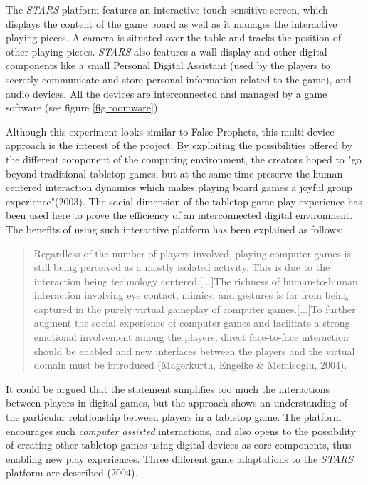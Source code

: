 The \textit{STARS} platform features an interactive touch-sensitive screen, which displays the content of the game board as well as it manages the interactive playing pieces. A camera is situated over the table and tracks the position of other playing pieces. \textit{STARS} also features a wall display and other digital components like a small Personal Digital Assistant (used by the players to secretly communicate and store personal information related to the game), and audio devices. All the devices are interconnected and managed by a game software (see figure \ref{fig:roomware}). 

Although this experiment looks similar to False Prophets, this multi-device approach is the interest of the project. By exploiting the possibilities offered by the different component of the computing environment, the creators hoped to "go beyond traditional tabletop games, but at the same time preserve the human centered interaction dynamics which makes playing board games a joyful group experience"(2003)\cite{art:stars}. The social dimension of the tabletop game play experience has been used here to prove the efficiency of an interconnected digital environment. The benefits of using such interactive platform has been explained as follows:
\begin{quotation}
Regardless of the number of players involved, playing computer games is still being perceived as a mostly isolated activity. This is due to the interaction being technology centered.[...]The richness of human-to-human interaction
involving eye contact, mimics, and gestures is far from being captured in the purely virtual gameplay of computer games.[...]To further augment the social experience of computer games and facilitate a strong emotional involvement among the players, direct face-to-face interaction should be enabled and new interfaces between the players and the virtual domain must be introduced (Magerkurth, Engelke \& Memisoglu, 2004)\cite{art:stars2}.
\end{quotation}
It could be argued that the statement simplifies too much the interactions between players in digital games, but the approach shows an understanding of the particular relationship between players in a tabletop game. The platform encourages such \textit{computer assisted} interactions, and also opens to the possibility of creating other tabletop games using digital devices as core components, thus enabling new play experiences. Three different game adaptations to the \textit{STARS} platform are described (2004)\cite{art:stars2}.
